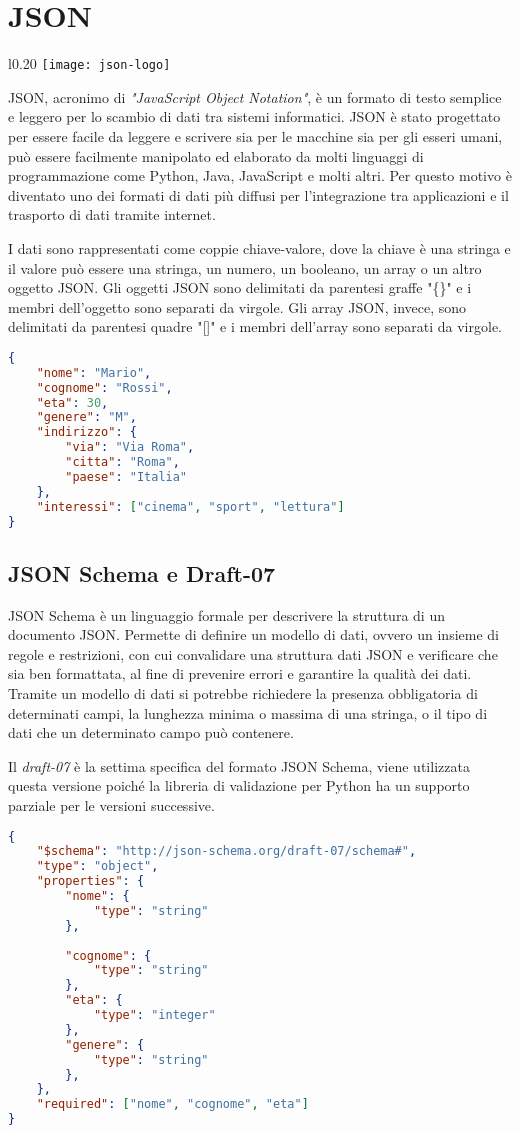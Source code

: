 {\section{JSON}
	
	\begin{wrapfigure}{l}{0.20\textwidth}
		\centering
		\texttt{[image: json-logo]}
	\end{wrapfigure}
	JSON, acronimo di \textit{"JavaScript Object Notation"}, è un formato di testo semplice e leggero per lo scambio di dati tra sistemi informatici. JSON è stato progettato per essere facile da leggere e scrivere sia per le macchine sia per gli esseri umani, può essere facilmente manipolato ed elaborato da molti linguaggi di programmazione come Python, Java, JavaScript e molti altri. Per questo motivo è diventato uno dei formati di dati più diffusi per l'integrazione tra applicazioni e il trasporto di dati tramite internet. \par
	I dati sono rappresentati come coppie chiave-valore, dove la chiave è una stringa e il valore può essere una stringa, un numero, un booleano, un array o un altro oggetto JSON. Gli oggetti JSON sono delimitati da parentesi graffe "\{\}" e i membri dell'oggetto sono separati da virgole. Gli array JSON, invece, sono delimitati da parentesi quadre "[]" e i membri dell'array sono separati da virgole.
	
	{\begin{lstlisting}[language=json, caption={Esempio di oggetto JSON}]
{
	"nome": "Mario",
	"cognome": "Rossi",
	"eta": 30,
	"genere": "M",
	"indirizzo": {
		"via": "Via Roma",
		"citta": "Roma",
		"paese": "Italia"
	},
	"interessi": ["cinema", "sport", "lettura"]
}\end{lstlisting}}
	
	\subsection{JSON Schema e Draft-07}
	JSON Schema\cite{JSON-Schema} è un linguaggio formale per descrivere la struttura di un documento JSON. Permette di definire un modello di dati, ovvero un insieme di regole e restrizioni, con cui convalidare una struttura dati JSON e verificare che sia ben formattata, al fine di prevenire errori e garantire la qualità dei dati. Tramite un modello di dati si potrebbe richiedere la presenza obbligatoria di determinati campi, la lunghezza minima o massima di una stringa, o il tipo di dati che un determinato campo può contenere.\par
	Il \textit{draft-07}\cite{JSON-Schema-Draft-07} è la settima specifica del formato JSON Schema, viene utilizzata questa versione poiché la libreria di validazione per Python\cite{python-jsonschema} ha un supporto parziale per le versioni successive.
{\begin{lstlisting}[language=json, caption={Esempio di modello di dati JSON-Schema}]
{
	"$schema": "http://json-schema.org/draft-07/schema#",
	"type": "object",
	"properties": {
		"nome": {
			"type": "string"
		},
		
		"cognome": {
			"type": "string"
		},
		"eta": {
			"type": "integer"
		},
		"genere": {
			"type": "string"
		},	
	},
	"required": ["nome", "cognome", "eta"]
}\end{lstlisting}}
}